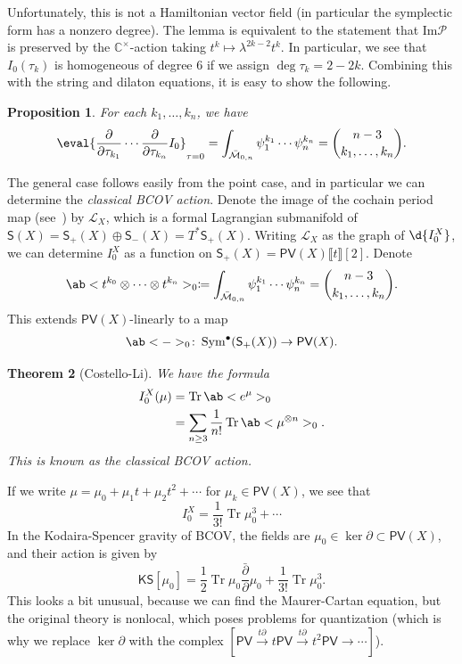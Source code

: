 \documentclass[article,10pt,oneside,oldfontcommands]{memoir}
\newtheorem{thm}{Theorem}[section]
\newtheorem{prop}[thm]{Proposition}
\theoremstyle{definition}
\theoremstyle{remark}
\theoremstyle{plain}
\theoremstyle{definition}
\theoremstyle{remark}
\newcommand{\Ima}{\mathrm{Im}}
\newcommand{\C}{\mathbb{C}}
\newcommand{\M}{\mathcal{M}}
\newcommand{\mc}[1]{\mathcal{#1}}
\newcommand{\on}[1]{\operatorname{#1}}
\newcommand{\ms}[1]{\mathsf{#1}}
\newcommand{\1}{\mathbf{1}}
\newcommand{\2}{\mathbf{2}}
\newcommand{\3}{\mathbf{3}}
\newcommand{\ps}[1]{\lBrack #1 \rBrack}
\newcommand{\dbar}{\bar{\partial}}
\begin{document}
Unfortunately, this is not a Hamiltonian vector field (in particular the symplectic form has a nonzero degree). The lemma is equivalent to the statement that \(\Ima\mc{P}\) is preserved by the \(\C^{\times}\)-action taking \(t^k \mapsto \lambda^{2k-2} t^k\). In particular, we see that \(I_0 (\tau_k)\) is homogeneous of degree \(6\) if we assign \(\deg \tau_k = 2-2k\). Combining this with the string and dilaton equations, it is easy to show the following.

\begin{prop}
    For each \(k_1, \ldots, k_n\), we have
    \[ \eval{\pdv{}{\tau_{k_1}} \cdots \pdv{}{\tau_{k_n}} I_0}_{\tau = 0} = \int_{\bar{\M}_{0,n}} \psi_1^{k_1} \cdots \psi_n ^{k_n} = \binom{n-3}{k_1, \ldots, k_n}. \]
\end{prop}

The general case follows easily from the point case, and in particular we can determine the \textit{classical BCOV action}. Denote the image of the cochain period map (see~) by \(\mc{L}_X\), which is a formal Lagrangian submanifold of \(\ms{S}(X) = \ms{S}_+(X) \oplus \ms{S}_-(X) = T^* \ms{S}_+(X)\). Writing \(\mc{L}_X\) as the graph of \(\d{I_0^X}\), we can determine \(I_0^X\) as a function on \(\ms{S}_+(X) = \ms{PV}(X) \ps{t}[2]\). Denote
\[ \ab< t^{k_0} \otimes \cdots \otimes t^{k_n}>_0 \coloneqq \int_{\bar{\M}_{0,n}} \psi_1^{k_1} \cdots \psi_n^{k_n} = \binom{n-3}{k_1, \ldots, k_n}. \]
This extends \(\ms{PV}(X)\)-linearly to a map
\[ \ab<->_0 \colon \on{Sym}^{\bullet} (\ms{S}_+(X)) \to \ms{PV}(X). \]

\begin{thm}[Costello-Li]
    We have the formula
    \begin{align*}
        I_0^X(\mu) &= \on{Tr} \ab<e^{\mu}>_0 \\
        &= \sum_{n \geq 3} \frac{1}{n!} \on{Tr} \ab<\mu^{\otimes n}>_0.
    \end{align*}
    This is known as the \textit{classical BCOV action}.
\end{thm}

If we write \(\mu = \mu_0 + \mu_1 t + \mu_2 t^2 + \cdots \) for \(\mu_k \in \ms{PV}(X)\), we see that 
\[ I_0^X = \frac{1}{3!} \on{Tr} \mu_0^3 + \cdots \]
In the Kodaira-Spencer gravity of BCOV, the fields are \(\mu_0 \in \ker \partial \subset \ms{PV}(X)\), and their action is given by
\[ \ms{KS}[\mu_0] = \frac{1}{2} \on{Tr} \mu_0 \frac{\dbar}{\partial} \mu_0 + \frac{1}{3!} \on{Tr} \mu_0^3. \]
This looks a bit unusual, because we can find the Maurer-Cartan equation, but the original theory is nonlocal, which poses problems for quantization (which is why we replace \(\ker \partial\) with the complex \([\ms{PV} \xrightarrow{t \partial} t \ms{PV} \xrightarrow{t \partial} t^2 \ms{PV} \to \cdots]\)).
\end{document}
